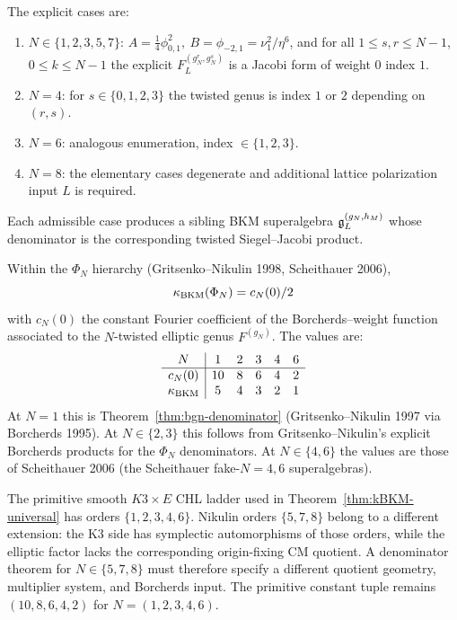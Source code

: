 \begin{remark}
The explicit cases are:
\begin{enumerate}
\item $N \in \{1, 2, 3, 5, 7\}$: $A = \tfrac{1}{4}\phi_{0,1}^2,\ B = \phi_{-2,1} = \nu_1^2/\eta^6$, and for all $1 \leq s, r \leq N-1$, $0 \leq k \leq N-1$ the explicit $F_L^{(g_N^r, g_N^s)}$ is a Jacobi form of weight $0$ index $1$.
\item $N = 4$: for $s \in \{0, 1, 2, 3\}$ the twisted genus is index $1$ or $2$ depending on $(r, s)$.
\item $N = 6$: analogous enumeration, index $\in \{1, 2, 3\}$.
\item $N = 8$: the elementary cases degenerate and additional lattice
polarization input $L$ is required.
\end{enumerate}
Each admissible case produces a sibling BKM superalgebra $\mathfrak{g}^{(g_N,h_M)}_L$
whose denominator is the corresponding twisted Siegel--Jacobi product.
\end{remark}

\begin{theorem}
\label{thm:kBKM-universal}
Within the $\Phi_N$ hierarchy (Gritsenko--Nikulin 1998, Scheithauer 2006),
\[
  \kappa_{\mathrm{BKM}}(\Phi_N) = c_N(0)/2
\]
with $c_N(0)$ the constant Fourier coefficient of the Borcherds--weight function associated to the $N$-twisted elliptic genus $F^{(g_N)}$. The values are:
\[
\begin{array}{c|ccccc}
N & 1 & 2 & 3 & 4 & 6 \\\hline
c_N(0) & 10 & 8 & 6 & 4 & 2 \\
\kappa_{\mathrm{BKM}} & 5 & 4 & 3 & 2 & 1
\end{array}
\]
At $N = 1$ this is Theorem~\ref{thm:bgn-denominator} (Gritsenko--Nikulin 1997 via Borcherds 1995). At $N \in \{2, 3\}$ this follows from Gritsenko--Nikulin's explicit Borcherds products for the $\Phi_N$ denominators. At $N \in \{4, 6\}$ the values are those of Scheithauer 2006 (the Scheithauer fake-$N=4,6$ superalgebras).
\end{theorem}

\begin{openproblem}[$N \in \{5, 7, 8\}$]
\label{prob:N-5-7-8}
The primitive smooth $K3\times E$ CHL ladder used in
Theorem~\ref{thm:kBKM-universal} has orders $\{1,2,3,4,6\}$. Nikulin
orders $\{5,7,8\}$ belong to a different extension: the K3 side has
symplectic automorphisms of those orders, while the elliptic factor
lacks the corresponding origin-fixing CM quotient. A denominator
theorem for $N\in\{5,7,8\}$ must therefore specify a different quotient
geometry, multiplier system, and Borcherds input. The primitive
constant tuple remains $(10,8,6,4,2)$ for
$N=(1,2,3,4,6)$.
\end{openproblem}

